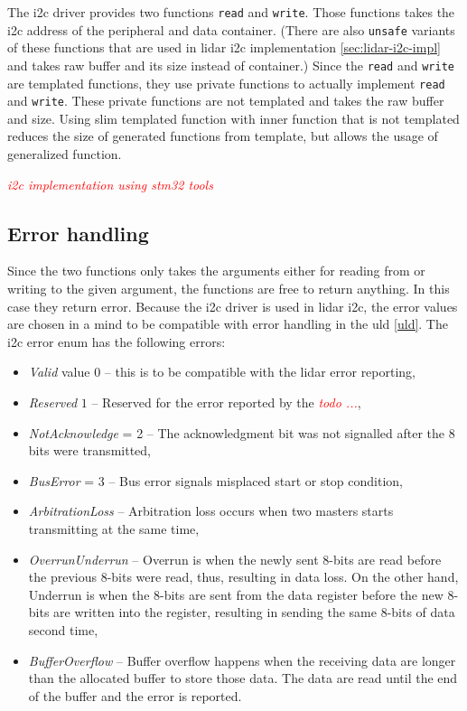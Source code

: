 \documentclass[
  digital,     %
  oneside,     %
  nosansbold,  %
  nocolorbold, %
  lof,         %
  lot,         %
]{fithesis4}
\newcommand{\TODO}[1]{\textcolor{red}{\textit{#1}}}
\begin{document}
{{{The \acrshort{i2c} driver provides two functions \lstinline|read| and \lstinline|write|. Those functions takes the \acrshort{i2c} address of the peripheral and data container. (There are also \lstinline|unsafe| variants of these functions that are used in \acrshort{lidar} \acrshort{i2c} implementation \ref{sec:lidar-i2c-impl} and takes raw buffer and its size instead of container.) Since the \lstinline|read| and \lstinline|write| are templated functions, they use private functions to actually implement \lstinline|read| and \lstinline|write|. These private functions are not templated and takes the raw buffer and size. Using slim templated function with inner function that is not templated reduces the size of generated functions from template, but allows the usage of generalized function.

\TODO{i2c implementation using stm32 tools}

\subsection{ Error handling }
Since the two functions only takes the arguments either for reading from or writing to the given argument, the functions are free to return anything. In this case they return error. Because the \acrshort{i2c} driver is used in \acrshort{lidar} \acrshort{i2c}, the error values are chosen in a mind to be compatible with error handling in the \acrshort{uld} \ref{uld}. The \acrshort{i2c} error enum has the following errors:
\begin{itemize}
    \item \emph{Valid} value $0$ -- this is to be compatible with the \acrshort{lidar} error reporting,
    \item \emph{Reserved} $1$ -- Reserved for the error reported by the \TODO{todo ...},
    \item \emph{NotAcknowledge} = 2 -- The acknowledgment bit was not signalled after the 8 bits were transmitted,
    \item \emph{BusError} = 3 -- Bus error signals misplaced start or stop condition,
    \item \emph{ArbitrationLoss} -- Arbitration loss occurs when two masters starts transmitting at the same time,
    \item \emph{OverrunUnderrun} -- Overrun is when the newly sent 8-bits are read before the previous 8-bits were read, thus, resulting in data loss. On the other hand, Underrun is when the 8-bits are sent from the data register before the new 8-bits are written into the register, resulting in sending the same 8-bits of data second time,
    \item \emph{BufferOverflow} -- Buffer overflow happens when the receiving data are longer than the allocated buffer to store those data. The data are read until the end of the buffer and the error is reported.
\end{itemize}

}}}
\end{document}
